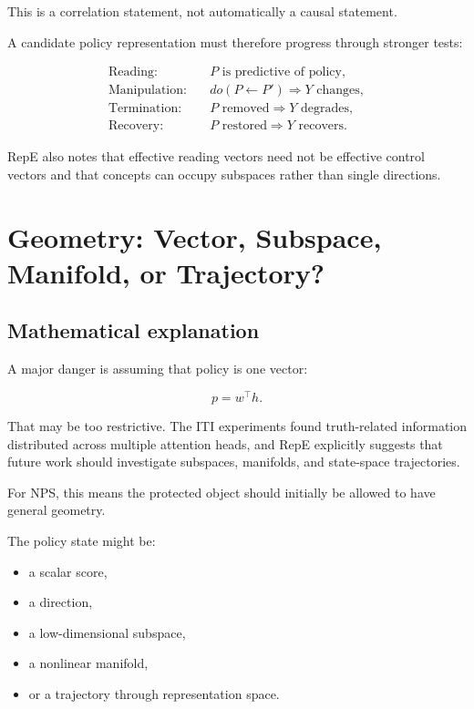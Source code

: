 \documentclass[11pt]{article}
\begin{document}
This is a correlation statement, not automatically a causal statement.

A candidate policy representation must therefore progress through stronger
tests:

\begin{align}
\text{Reading:}\quad&
P\text{ is predictive of policy},\\
\text{Manipulation:}\quad&
do(P\leftarrow P')\Rightarrow Y\text{ changes},\\
\text{Termination:}\quad&
P\text{ removed}\Rightarrow Y\text{ degrades},\\
\text{Recovery:}\quad&
P\text{ restored}\Rightarrow Y\text{ recovers}.
\end{align}

RepE also notes that effective reading vectors need not be effective control
vectors and that concepts can occupy subspaces rather than single
directions. \cite{repe}

\section{Geometry: Vector, Subspace, Manifold, or Trajectory?}

\subsection*{Mathematical explanation}

A major danger is assuming that policy is one vector:

\begin{equation}
p=w^\top h.
\end{equation}

That may be too restrictive. The ITI experiments found truth-related
information distributed across multiple attention heads, and RepE explicitly
suggests that future work should investigate subspaces, manifolds, and
state-space trajectories.

For NPS, this means the protected object should initially be allowed to have
general geometry.

The policy state might be:
\begin{itemize}
    \item a scalar score,
    \item a direction,
    \item a low-dimensional subspace,
    \item a nonlinear manifold,
    \item or a trajectory through representation space.
\end{itemize}
\end{document}
